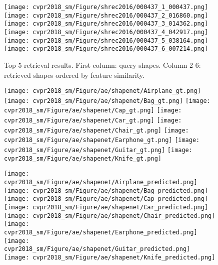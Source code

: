 \documentclass[10pt,twocolumn,letterpaper]{article}
\begin{document}
\begin{figure*}[h]
        \texttt{[image: cvpr2018\_sm/Figure/shrec2016/000437\_1\_000437.png]}
        \texttt{[image: cvpr2018\_sm/Figure/shrec2016/000437\_2\_016860.png]}
        \texttt{[image: cvpr2018\_sm/Figure/shrec2016/000437\_3\_014362.png]}
        \texttt{[image: cvpr2018\_sm/Figure/shrec2016/000437\_4\_042917.png]}
        \texttt{[image: cvpr2018\_sm/Figure/shrec2016/000437\_5\_038164.png]}
        \texttt{[image: cvpr2018\_sm/Figure/shrec2016/000437\_6\_007214.png]}
        
        \caption{Top 5 retrieval results. First column: query shapes. Column 2-6: retrieved shapes ordered by feature similarity.}
        \label{fig_shrec16_visualization}
        \vspace{-4pt}
\end{figure*}\begin{figure*}[t] 
        \centering
        
        \texttt{[image: cvpr2018\_sm/Figure/ae/shapenet/Airplane\_gt.png]}
        \texttt{[image: cvpr2018\_sm/Figure/ae/shapenet/Bag\_gt.png]}
        \texttt{[image: cvpr2018\_sm/Figure/ae/shapenet/Cap\_gt.png]}
        \texttt{[image: cvpr2018\_sm/Figure/ae/shapenet/Car\_gt.png]}
        \texttt{[image: cvpr2018\_sm/Figure/ae/shapenet/Chair\_gt.png]}
        \texttt{[image: cvpr2018\_sm/Figure/ae/shapenet/Earphone\_gt.png]}
        \texttt{[image: cvpr2018\_sm/Figure/ae/shapenet/Guitar\_gt.png]}
        \texttt{[image: cvpr2018\_sm/Figure/ae/shapenet/Knife\_gt.png]}
        
        \texttt{[image: cvpr2018\_sm/Figure/ae/shapenet/Airplane\_predicted.png]}
        \texttt{[image: cvpr2018\_sm/Figure/ae/shapenet/Bag\_predicted.png]}
        \texttt{[image: cvpr2018\_sm/Figure/ae/shapenet/Cap\_predicted.png]}
        \texttt{[image: cvpr2018\_sm/Figure/ae/shapenet/Car\_predicted.png]}
        \texttt{[image: cvpr2018\_sm/Figure/ae/shapenet/Chair\_predicted.png]}
        \texttt{[image: cvpr2018\_sm/Figure/ae/shapenet/Earphone\_predicted.png]}
        \texttt{[image: cvpr2018\_sm/Figure/ae/shapenet/Guitar\_predicted.png]}
        \texttt{[image: cvpr2018\_sm/Figure/ae/shapenet/Knife\_predicted.png]}
        

\end{figure*}
\end{document}
